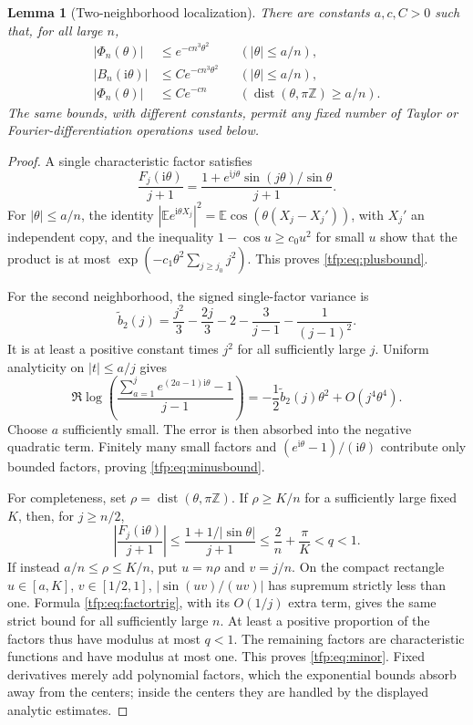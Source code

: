 \documentclass[11pt,a4paper]{article}
\numberwithin{equation}{section}
\newtheorem{lemma}[theorem]{Lemma}
\theoremstyle{definition}\newtheorem{definition}[theorem]{Definition}
\theoremstyle{remark}\newtheorem{remark}[theorem]{Remark}
\newcommand{\E}{\mathbb E}\newcommand{\PP}{\mathbb P}
\newcommand{\Z}{\mathbb Z}\newcommand{\R}{\mathbb R}
\newcommand{\dist}{\operatorname{dist}}
\newcommand{\ii}{\mathrm i}
\begin{document}
\begin{lemma}[Two-neighborhood localization]\label{tfp:lem:arcs}
There are constants $a,c,C>0$ such that, for all large $n$,
\begin{align}
 |\Phi_n(\theta)|&\le e^{-cn^3\theta^2}
                      &&(|\theta|\le a/n),\label{tfp:eq:plusbound}\\
 |B_n(\ii\theta)|&\le C e^{-cn^3\theta^2}
                      &&(|\theta|\le a/n),\label{tfp:eq:minusbound}\\
 |\Phi_n(\theta)|&\le C e^{-cn}
                      &&(\dist(\theta,\pi\Z)\ge a/n).
                      \label{tfp:eq:minor}
\end{align}
The same bounds, with different constants, permit any fixed number of
Taylor or Fourier-differentiation operations used below.
\end{lemma}
\begin{proof}
A single characteristic factor satisfies
\begin{equation}\label{tfp:eq:factortrig}
 \frac{F_j(\ii\theta)}{j+1}
 =\frac{1+e^{\ii j\theta}\sin(j\theta)/\sin\theta}{j+1}.
\end{equation}
For $|\theta|\le a/n$, the identity
$|\E e^{\ii\theta X_j}|^2=\E\cos(\theta(X_j-X_j'))$, with $X_j'$ an
independent copy, and the inequality $1-\cos u\ge c_0u^2$ for small $u$
show that the product is at most
$\exp(-c_1\theta^2\sum_{j\ge j_0}j^2)$. This proves
\eqref{tfp:eq:plusbound}.

For the second neighborhood, the signed single-factor variance is
\begin{equation}
 \widetilde b_2(j)=\frac{j^2}{3}-\frac{2j}{3}-2
                     -\frac3{j-1}-\frac1{(j-1)^2}.
\end{equation}
It is at least a positive constant times $j^2$ for all sufficiently large
$j$. Uniform analyticity on $|t|\le a/j$ gives
\[
 \Re\log\!\left(
 \frac{\sum_{a=1}^j e^{(2a-1)\ii\theta}-1}{j-1}\right)
   =-\frac12\widetilde b_2(j)\theta^2+O(j^4\theta^4).
\]
Choose $a$ sufficiently small. The error is then absorbed into the
negative quadratic term. Finitely many small factors and
$(e^{\ii\theta}-1)/(\ii\theta)$ contribute only bounded factors,
proving \eqref{tfp:eq:minusbound}.

For completeness, set $\rho=\dist(\theta,\pi\Z)$. If
$\rho\ge K/n$ for a sufficiently large fixed $K$, then, for $j\ge n/2$,
\[
 \left|\frac{F_j(\ii\theta)}{j+1}\right|
 \le \frac{1+1/|\sin\theta|}{j+1}
 \le \frac2n+\frac{\pi}{K}<q<1.
\]
If instead $a/n\le\rho\le K/n$, put $u=n\rho$ and $v=j/n$.
On the compact rectangle $u\in[a,K]$, $v\in[1/2,1]$,
$|\sin(uv)/(uv)|$ has supremum strictly less than one. Formula
\eqref{tfp:eq:factortrig}, with its $O(1/j)$ extra term, gives the same
strict bound for all sufficiently large $n$. At least a positive
proportion of the factors thus have modulus at most $q<1$. The remaining
factors are characteristic functions and have modulus at most one.
This proves \eqref{tfp:eq:minor}. Fixed derivatives merely add polynomial
factors, which the exponential bounds absorb away from the centers;
inside the centers they are handled by the displayed analytic estimates.
\end{proof}
\end{document}
